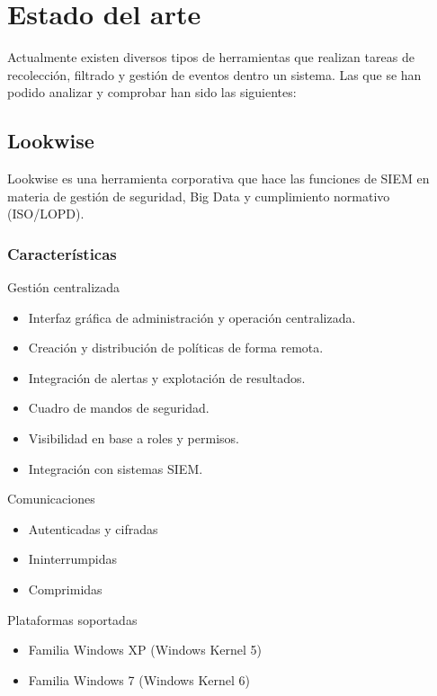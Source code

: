 \chapter{Estado del arte}
\label{chap:estado del arte}

Actualmente existen diversos tipos de herramientas que realizan tareas de recolección, filtrado y gestión de eventos dentro un sistema. Las que se han podido analizar y comprobar han sido las siguientes:

\section{Lookwise}

Lookwise es una herramienta corporativa que hace las funciones de SIEM en materia de gestión de seguridad, Big Data y cumplimiento normativo (ISO/LOPD).

\subsection{Características}

Gestión centralizada
\begin{itemize}
\item Interfaz gráfica de administración y operación centralizada.
\item Creación y distribución de políticas de forma remota.
\item Integración de alertas y explotación de resultados.
\item Cuadro de mandos de seguridad.
\item Visibilidad en base a roles y permisos.
\item Integración con sistemas SIEM.
\end{itemize}

Comunicaciones
\begin{itemize}
\item Autenticadas y cifradas
\item Ininterrumpidas
\item Comprimidas
\end{itemize}

Plataformas soportadas
\begin{itemize}
\item Familia Windows XP (Windows Kernel 5)
\item Familia Windows 7 (Windows Kernel 6)
\end{itemize}

